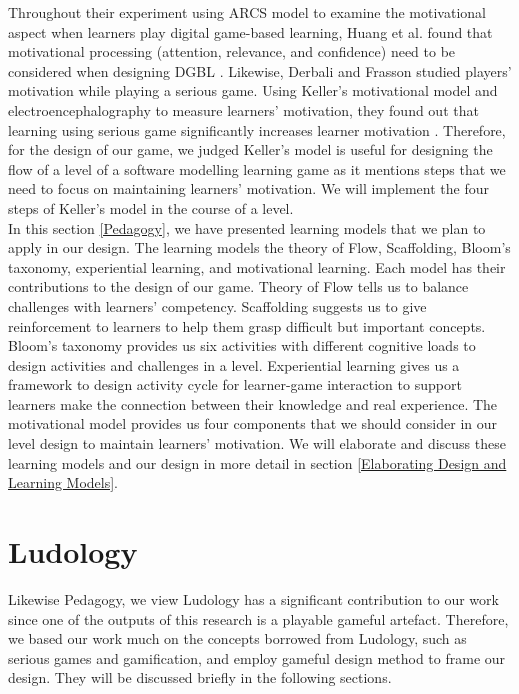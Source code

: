 \documentclass[12pt, a4paper]{report}
\begin{document}
Throughout their experiment using ARCS model to examine the motivational aspect when learners play digital game-based learning, Huang et al. found that motivational processing (attention, relevance, and confidence) need to be considered when designing DGBL \cite{huang2010sustaining}. Likewise, Derbali and Frasson studied players' motivation while playing a serious game. Using Keller's motivational model and electroencephalography to measure learners' motivation, they found out that learning using serious game significantly increases learner motivation \cite{derbali2010players}. Therefore, for the design of our game, we judged Keller's model is useful for designing the flow of a level of a software modelling learning game as it mentions steps that we need to focus on maintaining learners' motivation. We will implement the four steps of Keller's model in the course of a level.\\

In this section \ref{Pedagogy}, we have presented learning models that we plan to apply in our design. The learning models the theory of Flow, Scaffolding, Bloom's taxonomy, experiential learning, and motivational learning. Each model has their contributions to the design of our game. Theory of Flow tells us to balance challenges with learners' competency. Scaffolding suggests us to give reinforcement to learners to help them grasp difficult but important concepts. Bloom's taxonomy provides us six activities with different cognitive loads to design activities and challenges in a level. Experiential learning gives us a framework to design activity cycle for learner-game interaction to support learners make the connection between their knowledge and real experience. The motivational model provides us four components that we should consider in our level design to maintain learners' motivation. We will elaborate and discuss these learning models and our design in more detail in section \ref{Elaborating Design and Learning Models}. 

\section{Ludology}
Likewise Pedagogy, we view Ludology has a significant contribution to our work since one of the outputs of this research is a playable gameful artefact. Therefore, we based our work much on the concepts borrowed from Ludology, such as serious games and gamification, and employ gameful design method \cite{deterding2015lens} to frame our design. They will be discussed briefly in the following sections.   
\end{document}
